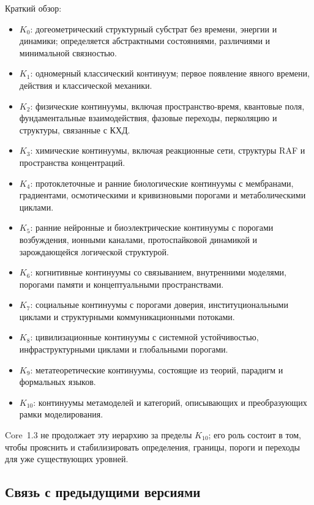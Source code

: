 Краткий обзор:

\begin{itemize}
    \item \(K_0\): догеометрический структурный субстрат без времени, энергии и динамики; определяется абстрактными состояниями, различиями и минимальной связностью.
    \item \(K_1\): одномерный классический континуум; первое появление явного времени, действия и классической механики.
    \item \(K_2\): физические континуумы, включая пространство-время, квантовые поля, фундаментальные взаимодействия, фазовые переходы, перколяцию и структуры, связанные с КХД.
    \item \(K_3\): химические континуумы, включая реакционные сети, структуры RAF и пространства концентраций.
    \item \(K_4\): протоклеточные и ранние биологические континуумы с мембранами, градиентами, осмотическими и кривизновыми порогами и метаболическими циклами.
    \item \(K_5\): ранние нейронные и биоэлектрические континуумы с порогами возбуждения, ионными каналами, протоспайковой динамикой и зарождающейся логической структурой.
    \item \(K_6\): когнитивные континуумы со связыванием, внутренними моделями, порогами памяти и концептуальными пространствами.
    \item \(K_7\): социальные континуумы с порогами доверия, институциональными циклами и структурными коммуникационными потоками.
    \item \(K_8\): цивилизационные континуумы с системной устойчивостью, инфраструктурными циклами и глобальными порогами.
    \item \(K_9\): метатеоретические континуумы, состоящие из теорий, парадигм и формальных языков.
    \item \(K_{10}\): континуумы метамоделей и категорий, описывающих и преобразующих рамки моделирования.
\end{itemize}

Core~1.3 не продолжает эту иерархию за пределы \(K_{10}\); его роль состоит в том, чтобы прояснить и стабилизировать определения, границы, пороги и переходы для уже существующих уровней.

\subsection{Связь с предыдущими версиями}

